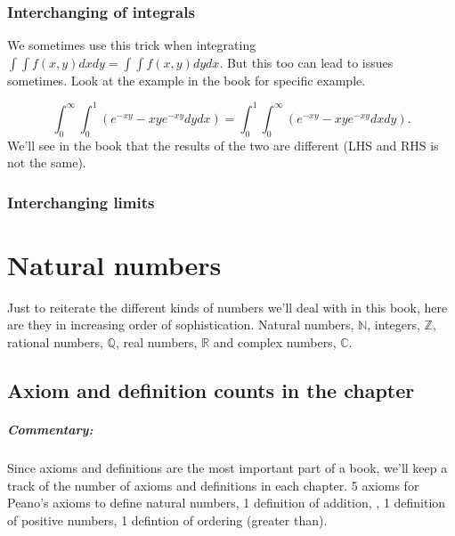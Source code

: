 \documentclass{report}
\begin{document}
\subsection{}
\subsection{}
\subsection{Interchanging of integrals}
We sometimes use this trick when integrating $\int \int f(x,y) dx dy = \int \int f(x,y) dy dx$. But this too can lead to issues sometimes. Look at the example in the book for specific example. 

\[
	\int_{0}^{\infty} \int_{0}^{1} \left( e^{-xy}-xye^{-xy}dy dx \right) = \int_{0}^{1} \int_{0}^{\infty} \left( e^{-xy}-xye^{-xy}dxdy \right)      
.\] 
We'll see in the book that the results of the two are different (LHS and RHS is not the same).

\subsection{Interchanging limits}
\subsection{}
\subsection{}


\chapter{Natural numbers}
Just to reiterate the different kinds of numbers we'll deal with in this book, here are they in increasing order of sophistication. Natural numbers, $\mathbb{N}$,  integers, $\mathbb{Z}$, rational numbers, $\mathbb{Q}$, real numbers, $\mathbb{R}$ and complex numbers, $\mathbb{C}$. 

\section*{Axiom and definition counts in the chapter}
\paragraph{Commentary: }Since axioms and definitions are the most important part of a book, we'll keep a track of the number of axioms and definitions in each chapter. 
5 axioms for Peano's axioms to define natural numbers,
1 definition of addition,
, 1 definition of positive numbers, 1 defintion of ordering (greater than). 
\end{document}
